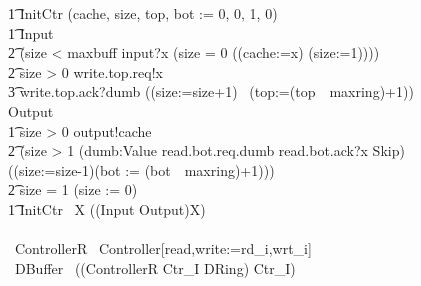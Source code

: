 \documentclass[10pt]{article}
\begin{document}
\begin{circus}
\t1 InitCtr \circdef (cache, size, top, bot := 0, 0, 1, 0) \\
\t1 Input \circdef \\
\t2 (\lcircguard size < maxbuff \rcircguard \circguard input?x \then (\lcircguard size = 0 \rcircguard \circguard ((cache:=x) \circseq (size:=1))))\\
\t2 \extchoice \lcircguard size > 0 \rcircguard \circguard write.top.req!x \then \\
\t3 write.top.ack?dumb \then ((size:=size+1) \circseq\ (top:=(top~\mod~maxring)+1))
    \\
 Output \circdef \\
 \t1 \lcircguard size > 0 \rcircguard \circguard output!cache \then\\
 \t2 (\lcircguard size > 1 \rcircguard \circguard 
 	(\Intchoice dumb:Value \circspot read.bot.req.dumb \then read.bot.ack?x \then Skip) \circseq \\
 	((size:=size-1)\circseq (bot := (bot~\mod~maxring)+1)))\\
 \t2 \extchoice \lcircguard size = 1 \rcircguard \circguard (size := 0) \\
\t1 \circspot InitCtr \circseq\ \circmu X \circspot ((Input \extchoice Output)\circseq X)
\\
\circend
\\
\circprocess\ ControllerR \circdef\ Controller[read,write:=rd\_i,wrt\_i]
\\
\circprocess\ DBuffer \circdef\ ((ControllerR \lpar Ctr\_I \rpar DRing) \circhide Ctr\_I)
\end{circus}%
\end{document}
